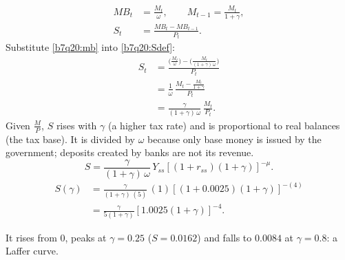 \begin{sol}
\begin{align}
MB_t&=\frac{M_t}{\omega},\qquad M_{t-1}=\frac{M_t}{1+\gamma}, \label{b7q20:mb}\\
S_t&=\frac{MB_t-MB_{t-1}}{P_t}. \label{b7q20:Sdef}
\end{align}
Substitute \eqref{b7q20:mb} into \eqref{b7q20:Sdef}:
\begin{align}
S_t&=\frac{\big(\frac{M_t}{\omega}\big)-\big(\frac{M_t}{(1+\gamma)\,\omega}\big)}{P_t}\nonumber\\
&=\frac1\omega\,\frac{M_t-\frac{M_t}{1+\gamma}}{P_t}\nonumber\\
&=\frac{\gamma}{(1+\gamma)\,\omega}\,\frac{M_t}{P_t}. \label{b7q20:S}
\end{align}
Given $\frac MP$, $S$ rises with $\gamma$ (a higher tax rate) and is proportional to real balances (the tax base). It is divided by
$\omega$ because only base money is issued by the government; deposits created by banks are not its revenue.
\begin{equation}
S=\frac{\gamma}{(1+\gamma)\,\omega}\,Y_{ss}\left[(1+r_{ss})(1+\gamma)\right]^{-\mu}. \label{b7q20:Sp}
\end{equation}
\begin{align}
S(\gamma)&=\frac{\gamma}{(1+\gamma)\,(5)}\,(1)\left[(1+0.0025)(1+\gamma)\right]^{-(4)}\nonumber\\
&=\frac{\gamma}{5(1+\gamma)}\left[1.0025(1+\gamma)\right]^{-4}. \label{b7q20:Snum}
\end{align}
\begin{center}
\end{center}
It rises from $0$, peaks at $\gamma=0.25$ ($S=0.0162$) and falls to $0.0084$ at $\gamma=0.8$: a Laffer curve.

\end{sol}
